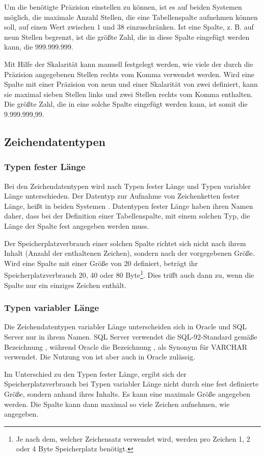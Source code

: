           Um die ben\"otigte Pr\"azision einstellen zu k\"onnen, ist es auf beiden Systemen m\"oglich, die maximale Anzahl Stellen, die eine Tabellenspalte aufnehmen k\"onnen soll, auf einen Wert zwischen 1 und 38 einzuschr\"anken. Ist eine Spalte, z. B. auf neun Stellen begrenzt, ist die gr\"o\ss te Zahl, die in diese Spalte eingef\"ugt werden kann, die 999.999.999.

          Mit Hilfe der Skalarit\"at kann manuell festgelegt werden, wie viele der durch die Pr\"azision angegebenen Stellen rechts vom Komma verwendet werden. Wird eine Spalte mit einer Pr\"azision von neun und einer Skalarit\"at von zwei definiert, kann sie maximal sieben Stellen links und zwei Stellen rechts vom Komma enthalten. Die gr\"o\ss te Zahl, die in eine solche Spalte eingef\"ugt werden kann, ist somit die 9.999.999,99.
      \subsection{Zeichendatentypen}
        \subsubsection{Typen fester L\"ange}
          Bei den Zeichendatentypen wird nach Typen fester L\"ange und Typen variabler L\"ange unterschieden. Der Datentyp zur Aufnahme von Zeichenketten fester L\"ange, hei\ss t in beiden Systemen . Datentypen fester L\"ange haben ihren Namen daher, dass bei der Definition einer Tabellenspalte, mit einem solchen Typ, die L\"ange der Spalte fest angegeben werden muss.
          \begin{merke}
            Der Speicherplatzverbrauch einer solchen Spalte richtet sich nicht nach ihrem Inhalt (Anzahl der enthaltenen Zeichen), sondern nach der vorgegebenen Gr\"o\ss e. Wird eine Spalte mit einer Gr\"o\ss e von 20 definiert, betr\"agt ihr Speicherplatzverbrauch 20, 40 oder 80 Byte\footnote{Je nach dem, welcher Zeichensatz verwendet wird, werden pro Zeichen 1, 2 oder 4 Byte Speicherplatz ben\"otigt.}. Dies trifft auch dann zu, wenn die Spalte nur ein einziges Zeichen enth\"alt.
          \end{merke}
        \subsubsection{Typen variabler L\"ange}
          Die Zeichendatentypen variabler L\"ange unterscheiden sich in Oracle und SQL Server nur in ihrem Namen. SQL Server verwendet die SQL-92-Standard gem\"a\ss e Bezeichnung , w\"ahrend Oracle die Bezeichnung , als Synonym f\"ur VARCHAR verwendet. Die Nutzung von  ist aber auch in Oracle zul\"assig.
          \begin{merke}
            Im Unterschied zu den Typen fester L\"ange, ergibt sich der Speicherplatzverbrauch bei Typen variabler L\"ange nicht durch eine fest definierte Gr\"o\ss e, sondern anhand ihres Inhalts. Es kann eine maximale Gr\"o\ss e angegeben werden. Die Spalte kann dann maximal so viele Zeichen aufnehmen, wie angegeben.
          \end{merke}

